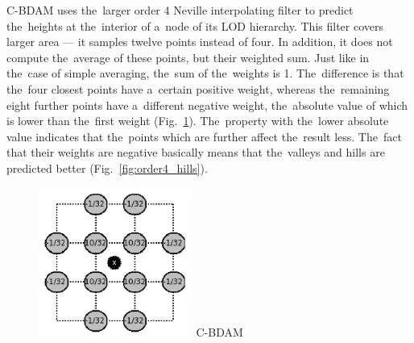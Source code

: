 C-BDAM uses the~larger order 4 Neville interpolating filter to predict the~heights at the~interior of a~node of its LOD hierarchy. This filter covers larger area --- it samples twelve points instead of four. In addition, it does not compute the~average of these points, but their weighted sum. Just like in the~case of simple averaging, the~sum of the~weights is 1. The~difference is that the~four closest points have a~certain positive weight, whereas the~remaining eight further points have a~different negative weight, the~absolute value of which is lower than the~first weight (Fig.~\ref{fig:order4}). The~property with the~lower absolute value indicates that the~points which are further affect the~result less. The~fact that their weights are negative basically means that the~valleys and hills are predicted better (Fig.~\ref{fig:order4_hills}). 

\begin{figure}
	\includegraphics[width=0.45\textwidth]{figures/order4.png}\centering
	{C-BDAM~\cite{cbdam}}
	\label{fig:order4}
\end{figure}

